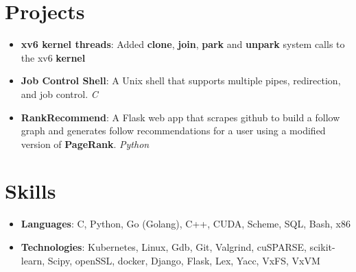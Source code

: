 \documentclass[letterpaper,11pt]{article}
\newcommand{\resumetiItem}[1]{
  \item\small{
    {#1 \vspace{-4pt}}
  }
}
\newcommand{\resumeItemListStart}{\begin{itemize}}
\newcommand{\resumeItemListEnd}{\end{itemize}\vspace{-5pt}}
\begin{document}
\section{Projects}
  \resumeItemListStart
    \resumetiItem{\textbf{xv6 kernel threads}: Added \textbf{clone}, \textbf{join}, \textbf{park} and \textbf{unpark} system calls to the xv6 \textbf{kernel}}
    \resumetiItem{\textbf{Job Control Shell}: A Unix shell that supports multiple pipes, redirection, and job control. \emph{C}}
    \resumetiItem{\textbf{RankRecommend}: A Flask web app that scrapes github to build a follow graph and generates follow recommendations for a user using a modified version of \textbf{PageRank}. \emph{Python}}
  \resumeItemListEnd

\section{Skills}
  \resumeItemListStart
    \resumetiItem{\textbf{Languages}: {C, Python, Go (Golang), C++, CUDA, Scheme, SQL, Bash, x86}}
    \resumetiItem{\textbf{Technologies}: {Kubernetes, Linux, Gdb, Git, Valgrind, cuSPARSE, scikit-learn, Scipy, openSSL, docker, Django, Flask, Lex, Yacc, VxFS, VxVM}}
\resumeItemListEnd



\end{document}
